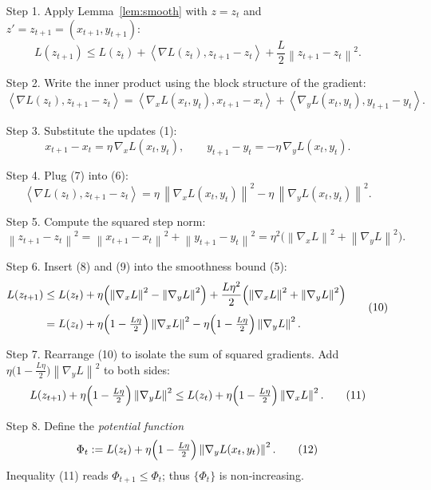\documentclass{article}
\newcommand{\norm}[1]{\left\| #1 \right\|}
\newcommand{\inner}[2]{\left\langle #1, #2 \right\rangle}
\begin{document}
\begin{enumerate}
\item[Step 1.]  Apply Lemma~\ref{lem:smooth} with \(z=z_t\) and
\(z'=z_{t+1}=(x_{t+1},y_{t+1})\):
\[
L(z_{t+1})\le L(z_t)+\inner{\nabla L(z_t)}{z_{t+1}-z_t}
+\frac{L}{2}\norm{z_{t+1}-z_t}^{2}.
\tag{5}
\]

\item[Step 2.]  Write the inner product using the block structure of the gradient:
\[
\inner{\nabla L(z_t)}{z_{t+1}-z_t}
= \inner{\nabla_x L(x_t,y_t)}{x_{t+1}-x_t}
+ \inner{\nabla_y L(x_t,y_t)}{y_{t+1}-y_t}.
\tag{6}
\]

\item[Step 3.]  Substitute the updates (1):
\[
x_{t+1}-x_t=\eta\,\nabla_x L(x_t,y_t),\qquad
y_{t+1}-y_t=-\eta\,\nabla_y L(x_t,y_t).
\tag{7}
\]

\item[Step 4.]  Plug (7) into (6):
\[
\inner{\nabla L(z_t)}{z_{t+1}-z_t}
= \eta\,\norm{\nabla_x L(x_t,y_t)}^{2}
-\eta\,\norm{\nabla_y L(x_t,y_t)}^{2}.
\tag{8}
\]

\item[Step 5.]  Compute the squared step norm:
\[
\norm{z_{t+1}-z_t}^{2}
= \norm{x_{t+1}-x_t}^{2}+\norm{y_{t+1}-y_t}^{2}
= \eta^{2}\bigl(\norm{\nabla_x L}^{2}+\norm{\nabla_y L}^{2}\bigr).
\tag{9}
\]

\item[Step 6.]  Insert (8) and (9) into the smoothness bound (5):
\[
\begin{aligned}
L(z_{t+1})
&\le L(z_t)
+ \eta\Bigl(\norm{\nabla_x L}^{2}-\norm{\nabla_y L}^{2}\Bigr)
+ \frac{L\eta^{2}}{2}\Bigl(\norm{\nabla_x L}^{2}+\norm{\nabla_y L}^{2}\Bigr)\\[4pt]
&= L(z_t)
+ \eta\Bigl(1-\tfrac{L\eta}{2}\Bigr)\norm{\nabla_x L}^{2}
-\eta\Bigl(1-\tfrac{L\eta}{2}\Bigr)\norm{\nabla_y L}^{2}.
\end{aligned}
\tag{10}
\]

\item[Step 7.]  Rearrange (10) to isolate the sum of squared gradients.
Add \(\eta\bigl(1-\tfrac{L\eta}{2}\bigr)\norm{\nabla_y L}^{2}\) to both sides:
\[
L(z_{t+1})+\eta\Bigl(1-\tfrac{L\eta}{2}\Bigr)\norm{\nabla_y L}^{2}
\le L(z_t)+\eta\Bigl(1-\tfrac{L\eta}{2}\Bigr)\norm{\nabla_x L}^{2}.
\tag{11}
\]

\item[Step 8.]  Define the \emph{potential function}
\[
\Phi_t:=L(z_t)+\eta\Bigl(1-\tfrac{L\eta}{2}\Bigr)\norm{\nabla_y L(x_t,y_t)}^{2}.
\tag{12}
\]
Inequality (11) reads \(\Phi_{t+1}\le \Phi_t\); thus \(\{\Phi_t\}\) is non‑increasing.


\end{enumerate}
\end{document}
